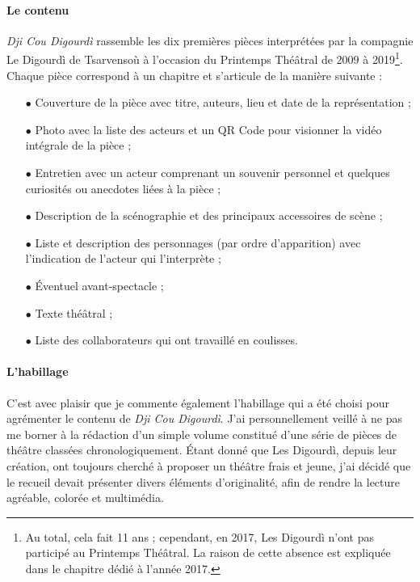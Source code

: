 \paragraph*{Le contenu}
\textit{Dji Cou Digourdì} rassemble les dix premières pièces interprétées par la compagnie Le Digourdì de Tsarvensoù à l'occasion du Printemps Thé\^atral de 2009 à 2019\footnote{ Au total, cela fait 11 ans ; cependant, en 2017, Les Digourdì n'ont pas participé au Printemps Thé\^atral. La raison de cette absence est expliquée dans le chapitre dédié à l'année 2017.}. Chaque pièce correspond à un chapitre et s'articule de la manière suivante :
\begin{itemize}
\item[$\bullet$] Couverture de la pièce avec titre, auteurs, lieu et date de la représentation ;
\item[$\bullet$] Photo avec la liste des acteurs et un QR Code pour visionner la vidéo intégrale de la pièce ;
\item[$\bullet$] Entretien avec un acteur comprenant un souvenir personnel et quelques curiosités ou anecdotes liées à la pièce ;
\item[$\bullet$] Description de la scénographie et des principaux accessoires de scène ;
\item[$\bullet$] Liste et description des personnages (par ordre d'apparition) avec l'indication de l'acteur qui l'interprète ;
\item[$\bullet$] Éventuel avant-spectacle ;
\item[$\bullet$] Texte théâtral ;
\item[$\bullet$] Liste des collaborateurs qui ont travaillé en coulisses.
\end{itemize}

\paragraph*{L'habillage}
C'est avec plaisir que je commente également l'habillage qui a été choisi pour agrémenter le contenu de \textit{Dji Cou Digourdì}. J'ai personnellement veillé à ne pas me borner à la rédaction d'un simple volume constitué d'une série de pièces de théâtre classées chronologiquement. Étant donné que Les Digourdì, depuis leur création, ont toujours cherché à proposer un théâtre frais et jeune, j'ai décidé que le recueil devait présenter divers éléments d'originalité, afin de rendre la lecture agréable, colorée et multimédia.

